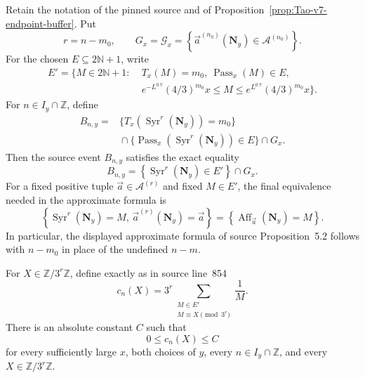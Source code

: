 \begin{proposition}
\label{prop:Tao-v7-Prop52-cn-repair}
Retain the notation of the pinned source and of
Proposition~\ref{prop:Tao-v7-endpoint-buffer}.  Put
\[
 r=n-m_0,
 \qquad
 G_x=\mathcal G_x
 =\left\{\vec a^{(n_0)}(\mathbf N_y)
                 \in\mathcal A^{(n_0)}\right\}.
\]
For the chosen \(E\subseteq2\mathbb N+1\), write
\[
\begin{split}
 E'=\{M\in2\mathbb N+1:\;&T_x(M)=m_0,\ 
       \operatorname{Pass}_x(M)\in E,\\
 &e^{-L^{0.7}}(4/3)^{m_0}x
       \leq M\leq e^{L^{0.7}}(4/3)^{m_0}x\}.
\end{split}
\]
For \(n\in I_y\cap\mathbb Z\), define
\[
\begin{split}
 B_{n,y}={}&
 \{T_x(\operatorname{Syr}^{r}(\mathbf N_y))=m_0\}\\
 &{}\cap
 \{\operatorname{Pass}_x(\operatorname{Syr}^{r}(\mathbf N_y))\in E\}
 \cap G_x.
\end{split}
\]
Then the source event \(B_{n,y}\) satisfies
the exact equality
\begin{equation}
\label{eq:Tao-v7-Bny-repaired}
 B_{n,y}
 =\left\{\operatorname{Syr}^{r}(\mathbf N_y)\in E'\right\}\cap G_x.
\end{equation}
For a fixed positive tuple
\(\vec a\in\mathcal A^{(r)}\) and fixed \(M\in E'\), the final equivalence
needed in the approximate formula is
\begin{equation}
\label{eq:Tao-v7-fixed-M-repaired}
 \left\{\operatorname{Syr}^{r}(\mathbf N_y)=M,\,
        \vec a^{(r)}(\mathbf N_y)=\vec a\right\}
 =\left\{\operatorname{Aff}_{\vec a}(\mathbf N_y)=M\right\}.
\end{equation}
In particular, the displayed approximate formula of source
Proposition~5.2 follows with \(n-m_0\) in place of the undefined \(n-m\).

For \(X\in\mathbb Z/3^r\mathbb Z\), define exactly as in source line~854
\begin{equation}
\label{eq:Tao-v7-cn}
 c_n(X)=3^r
   \sum_{\substack{M\in E'\\M\equiv X\pmod{3^r}}}\frac1M.
\end{equation}
There is an absolute constant \(C\) such that
\begin{equation}
\label{eq:Tao-v7-cn-uniform}
 0\leq c_n(X)\leq C
\end{equation}
for every sufficiently large \(x\), both choices of \(y\), every
\(n\in I_y\cap\mathbb Z\), and every \(X\in\mathbb Z/3^r\mathbb Z\).


\end{proposition}
